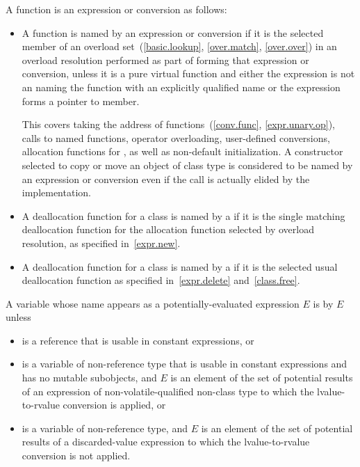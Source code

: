 \pnum
A function is 
an expression or conversion as follows:
\begin{itemize}
\item
  A function is named by an expression or conversion
  if it is the selected member
  of an overload set~(\ref{basic.lookup}, \ref{over.match}, \ref{over.over})
  in an overload resolution performed
  as part of forming that expression or conversion,
  unless it is a pure virtual function and either
  the expression is not an  naming the function with
  an explicitly qualified name or
  the expression forms a pointer to member.
  \begin{note}
This covers
  taking the address of functions~(\ref{conv.func}, \ref{expr.unary.op}),
  calls to named functions,
  operator overloading,
  user-defined conversions,
  allocation functions for , as well as
  non-default initialization.
  A constructor selected to copy or move an object of class type
  is considered to be named by an expression or conversion
  even if the call is actually elided by the implementation.
\end{note}
\item
  A deallocation function for a class
  is named by a 
  if it is the single matching deallocation function
  for the allocation function selected by overload resolution,
  as specified in~\ref{expr.new}.
\item
  A deallocation function for a class
  is named by a 
  if it is the selected usual deallocation function
  as specified in~\ref{expr.delete} and~\ref{class.free}.
\end{itemize}

\pnum
A variable  whose name appears as a
potentially-evaluated expression $E$
is  by $E$ unless
\begin{itemize}
\item
   is a reference that is
  usable in constant expressions, or
\item
   is a variable of non-reference type that is
  usable in constant expressions and has no mutable subobjects, and
  $E$ is an element of the set of potential results of an expression
  of non-volatile-qualified non-class type
  to which the lvalue-to-rvalue conversion is applied, or
\item
   is a variable of non-reference type, and
  $E$ is an element of the set of potential results
  of a discarded-value expression
  to which the lvalue-to-rvalue conversion is not applied.
\end{itemize}

